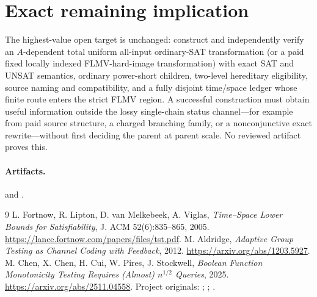 \documentclass[11pt]{article}
\begin{document}
\section{Exact remaining implication}
The highest-value open target is unchanged: construct and independently verify
an $A$-dependent total uniform all-input ordinary-SAT transformation (or a
paid fixed locally indexed FLMV-hard-image transformation) with exact SAT and
UNSAT semantics, ordinary power-short children, two-level hereditary
eligibility, source naming and compatibility, and a fully disjoint
time/space ledger whose finite route enters the strict FLMV region.  A
successful construction must obtain useful information outside the lossy
single-chain status channel---for example from paid source structure, a
charged branching family, or a nonconjunctive exact rewrite---without first
deciding the parent at parent scale.  No reviewed artifact proves this.

\paragraph{Artifacts.}
 and
.

\begin{thebibliography}{9}
L. Fortnow, R. Lipton, D. van Melkebeek, A. Viglas,
\emph{Time--Space Lower Bounds for Satisfiability},
J. ACM 52(6):835--865, 2005.
\url{https://lance.fortnow.com/papers/files/tst.pdf}.
M. Aldridge, \emph{Adaptive Group Testing as Channel Coding with Feedback},
2012. \url{https://arxiv.org/abs/1203.5927}.
M. Chen, X. Chen, H. Cui, W. Pires, J. Stockwell,
\emph{Boolean Function Monotonicity Testing Requires (Almost)
$n^{1/2}$ Queries}, 2025.
\url{https://arxiv.org/abs/2511.04558}.
Project originals:
;
;
.
\end{thebibliography}
\end{document}
